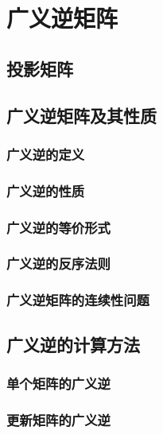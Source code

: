 \chapter{广义逆矩阵}
\label{cha:广义逆矩阵}

\section{投影矩阵}
\label{sec:投影矩阵}

\section{广义逆矩阵及其性质}
\label{sec:广义逆矩阵及其性质}

\subsection{广义逆的定义}
\label{sub:广义逆的定义}

\subsection{广义逆的性质}
\label{sub:广义逆的性质}

\subsection{广义逆的等价形式}
\label{sub:广义逆的等价形式}

\subsection{广义逆的反序法则}
\label{sub:广义逆的反序法则}

\subsection{广义逆矩阵的连续性问题}
\label{sub:广义逆矩阵的连续性问题}

\section{广义逆的计算方法}
\label{sec:广义逆的计算方法}

\subsection{单个矩阵的广义逆}
\label{sub:单个矩阵的广义逆}

\subsection{更新矩阵的广义逆}
\label{sub:更新矩阵的广义逆}

